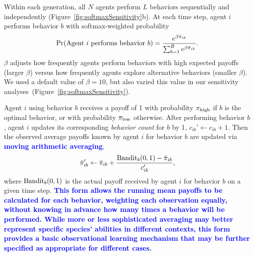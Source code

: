 \documentclass[letterpaper,11.5pt]{scrartcl}
\newcommand{\edit}[1]{{\bfseries \textcolor{blue} {#1}}}
\begin{document}
Within each generation, all $N$ agents perform $L$ behaviors sequentially and
independently (Figure~\ref{fig:softmaxSensitivity}b).
At each time step, agent $i$ performs behavior $b$ with softmax-weighted probability
\begin{equation}
  \Pr(\text{Agent $i$ performs behavior $b$}) = 
    \frac{e^{\beta \bar\pi_{ib}}}{\sum_{b=1}^B e^{\beta \bar\pi_{ib}}}.
\end{equation}
\noindent
$\beta$ adjusts how frequently agents perform 
behaviors with high expected payoffs (larger $\beta$) versus how frequently
agents explore alternative behaviors (smaller $\beta$). %
We used a default value of $\beta = 10$, but also varied this value in our
sensitivity analyses~(Figure~\ref{fig:softmaxSensitivity}). 

Agent $i$ using behavior $b$ receives a payoff of 1 with probability $\pi_{\mathrm{high}}$
if $b$ is the optimal behavior, or with probability $\pi_{\mathrm{low}}$ otherwise. 
After performing behavior $b$, agent $i$ updates its
corresponding \emph{behavior count} for $b$ by 1, $c_{ib}' \leftarrow c_{ib} + 1$.
Then the observed average payoffs known by agent $i$ for behavior $b$ are updated
via \edit{moving arithmetic averaging},
\begin{equation}
  \bar\pi_{ib}' \leftarrow \bar\pi_{ib} + \frac{\text{Bandit}_b(0, 1) - \bar\pi_{ib}}{c_{ib}'},
\end{equation}
\noindent
where $\text{Bandit}_b(0, 1)$ is the actual payoff received by agent $i$ for behavior $b$ on a
given %
time step. \edit{This form allows the running mean payoffs to be calculated for each
behavior, weighting each observation equally, without knowing in advance how many
times a behavior will be performed. While more or less sophisticated averaging may
better represent specific species' abilities in different contexts, this form
provides a basic observational learning mechanism that may be further specified as
appropriate for different cases.}
\end{document}
